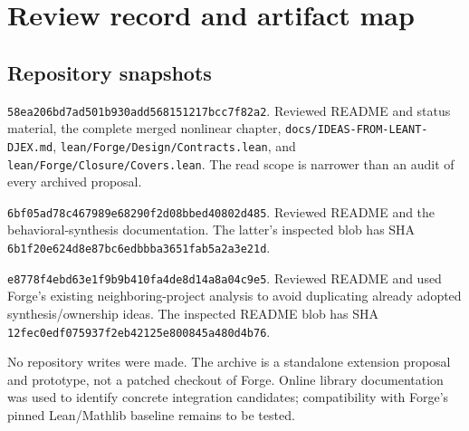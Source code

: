 \section{Review record and artifact map}
\subsection{Repository snapshots}
\begin{description}[style=nextline,leftmargin=0pt,labelwidth=0pt,labelsep=0pt]
\item[Forge]
\nolinkurl{58ea206bd7ad501b930add568151217bcc7f82a2}. Reviewed README and status material, the complete merged nonlinear chapter, \nolinkurl{docs/IDEAS-FROM-LEANT-DJEX.md}, \nolinkurl{lean/Forge/Design/Contracts.lean}, and \nolinkurl{lean/Forge/Closure/Covers.lean}. The read scope is narrower than an audit of every archived proposal.
\item[Leant]
\nolinkurl{6bf05ad78c467989e68290f2d08bbed40802d485}. Reviewed README and the behavioral-synthesis documentation. The latter's inspected blob has SHA \nolinkurl{6b1f20e624d8e87bc6edbbba3651fab5a2a3e21d}.
\item[Djex]
\nolinkurl{e8778f4ebd63e1f9b9b410fa4de8d14a8a04c9e5}. Reviewed README and used Forge's existing neighboring-project analysis to avoid duplicating already adopted synthesis/ownership ideas. The inspected README blob has SHA \nolinkurl{12fec0edf075937f2eb42125e800845a480d4b76}.
\end{description}
No repository writes were made. The archive is a standalone extension proposal and prototype, not a patched checkout of Forge. Online library documentation was used to identify concrete integration candidates; compatibility with Forge's pinned Lean/Mathlib baseline remains to be tested.

